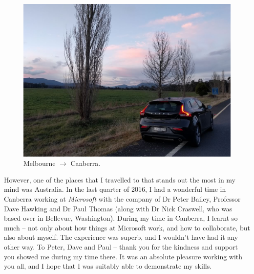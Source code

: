 \begin{preamble}
\renewcommand{\figurename}{Picture}
\begin{figure}
    \begin{center}
    \vspace*{-9mm}
    \includegraphics[width=1\textwidth]{figures/ch0-aus.jpg}
    \end{center}
    \vspace*{-6mm}
    \caption{Melbourne $\rightarrow$ Canberra.}
    \label{fig:acks_australia}
\end{figure}
\renewcommand{\figurename}{Figure}

However, one of the places that I travelled to that stands out the most in my mind was Australia. In the last quarter of 2016, I had a wonderful time in Canberra working at \emph{Microsoft} with the company of Dr Peter Bailey, Professor Dave Hawking and Dr Paul Thomas (along with Dr Nick Craswell, who was based over in Bellevue, Washington). During my time in Canberra, I learnt so much -- not only about how things at Microsoft work, and how to collaborate, but also about myself. The experience was superb, and I wouldn't have had it any other way. To Peter, Dave and Paul -- thank you for the kindness and support you showed me during my time there. It was an absolute pleasure working with you all, and I hope that I was suitably able to demonstrate my skills.


\end{preamble}
